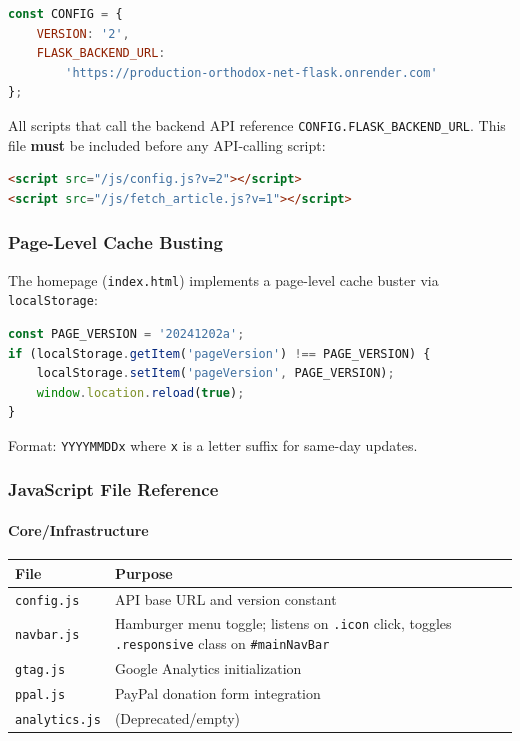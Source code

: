\documentclass[12pt]{article}
\begin{document}
\begin{lstlisting}[language=JavaScript,caption={/content/js/config.js}]
const CONFIG = {
    VERSION: '2',
    FLASK_BACKEND_URL:
        'https://production-orthodox-net-flask.onrender.com'
};
\end{lstlisting}

All scripts that call the backend API reference \texttt{CONFIG.FLASK\_BACKEND\_URL}. This file \textbf{must} be included before any API-calling script:

\begin{lstlisting}[language=HTML,numbers=none]
<script src="/js/config.js?v=2"></script>
<script src="/js/fetch_article.js?v=1"></script>
\end{lstlisting}

\subsubsection{Page-Level Cache Busting}

The homepage (\texttt{index.html}) implements a page-level cache buster via \texttt{localStorage}:

\begin{lstlisting}[language=JavaScript,numbers=none]
const PAGE_VERSION = '20241202a';
if (localStorage.getItem('pageVersion') !== PAGE_VERSION) {
    localStorage.setItem('pageVersion', PAGE_VERSION);
    window.location.reload(true);
}
\end{lstlisting}

Format: \texttt{YYYYMMDDx} where \texttt{x} is a letter suffix for same-day updates.

\subsubsection{JavaScript File Reference}

\paragraph{Core/Infrastructure}

\begin{longtable}{p{4.5cm}p{8cm}}
\toprule
\textbf{File} & \textbf{Purpose} \\
\midrule
\texttt{config.js} & API base URL and version constant \\
\texttt{navbar.js} & Hamburger menu toggle; listens on \texttt{.icon} click, toggles \texttt{.responsive} class on \texttt{\#mainNavBar} \\
\texttt{gtag.js} & Google Analytics initialization \\
\texttt{ppal.js} & PayPal donation form integration \\
\texttt{analytics.js} & (Deprecated/empty) \\
\bottomrule
\end{longtable}
\end{document}
